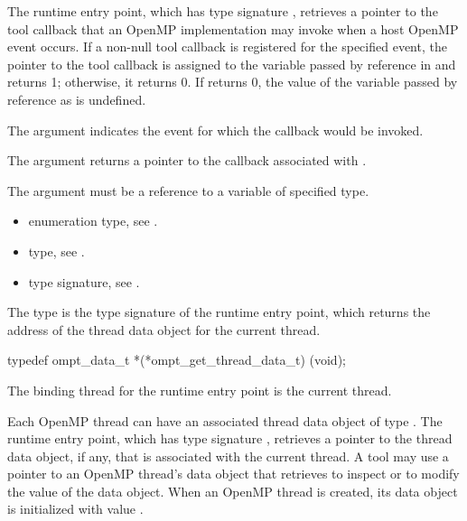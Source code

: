 \descr
The  runtime entry point, which has type signature 
, retrieves a pointer to the tool callback that
an OpenMP implementation may invoke when a host OpenMP event occurs. If a 
non-null tool callback is registered for the specified event, the pointer 
to the tool callback is assigned to the variable passed by reference in
 and  returns 1; otherwise, it returns 0. 
If  returns 0, the value of the variable passed by 
reference as  is undefined.

\argdesc
The  argument indicates the event for which the callback would 
be invoked.

The  argument returns a pointer to the callback associated 
with .

\constraints
The  argument must be a reference to a variable of specified type.

\crossreferences
\begin{itemize}
\item {} enumeration type, see .

\item {} type, see .

\item {} type signature,
see .
\end{itemize}


\label{sec:ompt_get_thread_data_t}
\label{sec:ompt_get_thread_data}

\summary
The  type is the type signature of the 
 runtime entry point, which returns the
address of the thread data object for the current thread.

\format
\begin{ccppspecific}
\begin{omptInquiry}
typedef ompt_data_t *(*ompt_get_thread_data_t) (void);
\end{omptInquiry}
\end{ccppspecific}

\binding
The binding thread for the  runtime entry 
point is the current thread.

\descr
Each OpenMP thread can have an associated thread data object of type 
. The  runtime entry point, 
which has type signature , retrieves a pointer 
to the thread data object, if any, that is associated with the current thread. 
A tool may use a pointer to an OpenMP thread's data object that 
 retrieves to inspect or to modify the value of 
the data object. When an OpenMP thread is created, its data object is
initialized with value .

